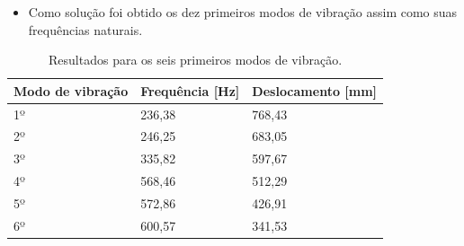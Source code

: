 \begin{enumerate}
\begin{itemize}
		\item Como solução foi obtido os dez primeiros modos de vibração assim como suas frequências naturais.
	\end{itemize}
	
	\begin{table}[H]
		\centering
		\caption{Resultados para os seis primeiros modos de vibração.}
		\begin{tabular}{|l|l|l|}
			\hline
			Modo de vibração & Frequência {[}Hz{]} & Deslocamento {[}mm{]} \\ \hline
			1º               & 236,38              & 768,43                \\ \hline
			2º               & 246,25              & 683,05                \\ \hline
			3º               & 335,82              & 597,67                \\ \hline
			4º               & 568,46              & 512,29                \\ \hline
			5º               & 572,86              & 426,91                \\ \hline
			6º               & 600,57              & 341,53                \\ \hline
		\end{tabular}
	\end{table}
	

\end{enumerate}
